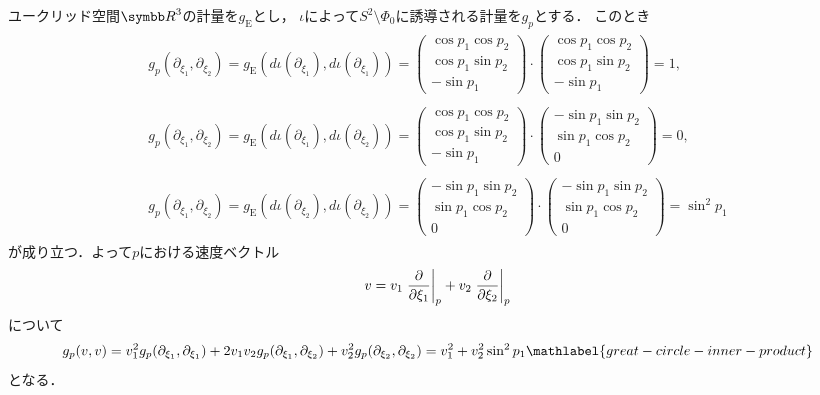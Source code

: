 \documentclass{ltjsarticle}
\begin{document}
ユークリッド空間\({\Real}^3\)の計量を\(g_\text{E}\)とし，
\(\iota\)によって\(S^2 \setminus \Phi_0\)に誘導される計量を\(g_p\)とする．
このとき
\begin{gather*}
    \begin{split}
    g_p(\partial_{\xi_1}, \partial_{\xi_2})
    =
    g_\text{E}(d\iota(\partial_{\xi_1}), d\iota(\partial_{\xi_1}))
    =
    \begin{pmatrix}
        \cos p_1 \cos p_2 \\
        \cos p_1 \sin p_2 \\
        - \sin p_1
    \end{pmatrix}
    \cdot
    \begin{pmatrix}
        \cos p_1 \cos p_2 \\
        \cos p_1 \sin p_2 \\
        - \sin p_1
    \end{pmatrix}
    = 1,
    \end{split} \\
    \begin{split}
    g_p(\partial_{\xi_1}, \partial_{\xi_2})
    =
    g_\text{E}(d\iota (\partial_{\xi_1}), d\iota (\partial_{\xi_2}))
    =
    \begin{pmatrix}
        \cos p_1 \cos p_2 \\
        \cos p_1 \sin p_2 \\
        - \sin p_1
    \end{pmatrix}
    \cdot
    \begin{pmatrix}
        - \sin p_1 \sin p_2 \\
        \sin p_1 \cos p_2 \\
        0
    \end{pmatrix}
    = 0,
    \end{split} \\
    \begin{split}
    g_p(\partial_{\xi_1}, \partial_{\xi_2})
    = g_\text{E}(d\iota (\partial_{\xi_2}), d\iota (\partial_{\xi_2}))
    =
    \begin{pmatrix}
        - \sin p_1 \sin p_2 \\
        \sin p_1 \cos p_2 \\
        0
    \end{pmatrix}
    \cdot
    \begin{pmatrix}
        - \sin p_1 \sin p_2 \\
        \sin p_1 \cos p_2 \\
        0
    \end{pmatrix}
    = \sin^2 p_1
    \end{split}
\end{gather*}
が成り立つ．よって\(p\)における速度ベクトル
\begin{align*}
    v = v_1 \left.\frac{\partial}{\partial \xi_1}\right\lvert_{p} + v_2 \left.\frac{\partial}{\partial \xi_2}\right\lvert_{p}
\end{align*}
について
\begin{align}
    g_p(v, v)
    = v_1^2 g_p(\partial_{\xi_1}, \partial_{\xi_1}) + 2 v_1 v_2 g_p(\partial_{\xi_1}, \partial_{\xi_2}) + v_2^2 g_p(\partial_{\xi_2}, \partial_{\xi_2})
    = v_1^2 + v_2^2 \sin^2 p_1 \mathlabel{great-circle-inner-product}
\end{align}
となる．
\end{document}
